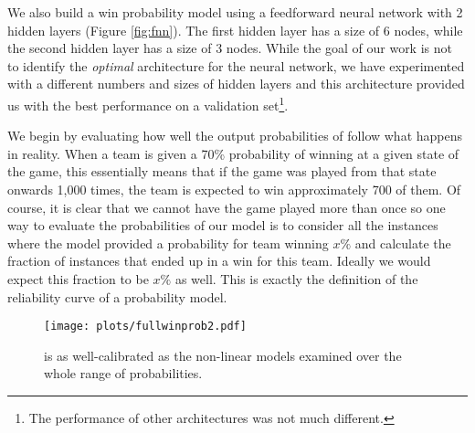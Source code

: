 \documentclass{sig-alternate}
\begin{document}
\begin{figure*}
\caption{The Feedforward Neural Network we used for the win probability includes two hidden layers (blue nodes).} \label{fig:fnn}
\end{figure*}

We also build a win probability model using a feedforward neural network with 2 hidden layers (Figure \ref{fig:fnn}). 
The first hidden layer has a size of 6 nodes, while the second hidden layer has a size of 3 nodes. 
While the goal of our work is not to identify the {\em optimal} architecture for the neural network, we have experimented with a different numbers and sizes of hidden layers and this architecture provided us with the best performance on a validation set\footnote{The performance of other architectures was not much different.}.  

We begin by evaluating how well the output probabilities of {\method} follow what happens in reality.  
When a team is given a 70\% probability of winning at a given state of the game, this essentially means that if the game was played from that state onwards 1,000 times, the team is expected to win approximately 700 of them.  
Of course, it is clear that we cannot have the game played more than once so one way to evaluate the probabilities of our model is to consider all the instances where the model provided a probability for team winning $x\%$ and calculate the fraction of instances that ended up in a win for this team.  
Ideally we would expect this fraction to be $x\%$ as well. 
This is exactly the definition of the reliability curve of a probability model. 

\begin{figure}[t]
\begin{center}
\texttt{[image: plots/fullwinprob2.pdf]}%
 \caption{{\method} is as well-calibrated as the non-linear models examined over the whole range of probabilities.}
 \label{fig:fullwp}
\end{center}
\end{figure}
\end{document}
